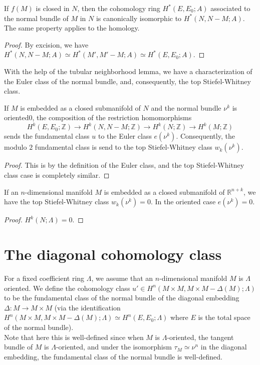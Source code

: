	\begin{coro}
		If $f(M)$ is closed in $N$, then the cohomology ring $H^*(E,E_0;A)$ associated to the normal bundle of $M$ in $N$ is canonically isomorphic to $H^*(N,N-M;A)$. The same property applies to the homology. 
	\end{coro}
	\begin{proof}
		By excision, we have $H^*(N,N-M;A)\simeq H^*(M',M'-M;A)\simeq H^*(E,E_0;A)$. 
	\end{proof}

	With the help of the tubular neighborhood lemma, we have a characterization of the Euler class of the normal bundle, and, consequently, the top Stiefel-Whitney class. 
	\begin{prop}\label{Fund_Euler}
		If $M$ is embedded as a closed submanifold of $N$ and the normal bundle $\nu^k$ is oriented0, the composition of the restriction homomorphisms 
		\[ H^k(E,E_0;\mathbb{Z})\to H^k(N,N-M;\mathbb{Z})\to H^k(N;\mathbb{Z})\to H^k(M;\mathbb{Z}) \]
		sends the fundamental class $u$ to the Euler class $e(\nu^k)$. Consequently, the modulo $2$ fundamental class is send to the top Stiefel-Whitney class $w_k(\nu^k)$. 
	\end{prop}
	\begin{proof}
		This is by the definition of the Euler class, and the top Stiefel-Whitney class case is completely similar. 
	\end{proof}

	\begin{coro}
		If an $n$-dimensional manifold $M$ is embedded as a closed submanifold of $\mathbb{R}^{n+k}$, we have the top Stiefel-Whitney class $w_k(\nu^k)=0$. In the oriented case $e(\nu^k)=0$. 
	\end{coro}
	\begin{proof}
		$H^k(N;\Lambda)=0$. 
	\end{proof}

\section{The diagonal cohomology class}

	\begin{defn}
		For a fixed coefficient ring $\Lambda$, we assume that an $n$-dimensional manifold $M$ is $\Lambda$ oriented. We define the cohomology class $u'\in H^n(M\times M,M\times M-\Delta(M);\Lambda)$ to be the fundamental class of the normal bundle of the diagonal embedding $\Delta:M\to M\times M$ (via the identification $H^n(M\times M,M\times M-\Delta(M);\Lambda)\simeq H^n(E,E_0;\Lambda)$ where $E$ is the total space of the normal bundle). \\
		Note that here this is well-defined since when $M$ is $\Lambda$-oriented, the tangent bundle of $M$ is $\Lambda$-oriented, and under the isomorphism $\tau_M\simeq\nu^n$ in the diagonal embedding, the fundamental class of the normal bundle is well-defined. 
	\end{defn}

